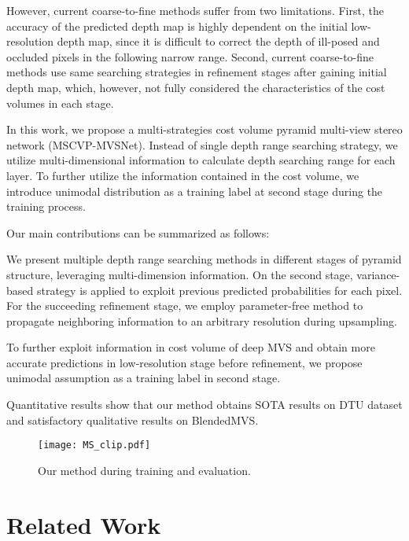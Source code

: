 \documentclass{article}
\begin{document}
However, current coarse-to-fine methods suffer from two limitations.
First, the accuracy of the predicted depth map is highly dependent on the initial low-resolution depth map, since it is difficult to correct the depth of ill-posed and occluded pixels in the following narrow range. 
Second, current coarse-to-fine methods use same searching strategies in refinement stages after gaining initial depth map, which, however, not fully considered the characteristics of the cost volumes in each stage.

In this work, we propose a multi-strategies cost volume pyramid multi-view stereo network (MSCVP-MVSNet).
Instead of single depth range searching strategy, we utilize multi-dimensional information to calculate depth searching range for each layer.
To further utilize the information contained in the cost volume, we introduce unimodal distribution as a training label at second stage during the training process.

Our main contributions can be summarized as follows:

We present multiple depth range searching methods in different stages of pyramid structure, leveraging multi-dimension information.
On the second stage, variance-based strategy is applied to exploit previous predicted probabilities for each pixel.
For the succeeding refinement stage, we employ parameter-free method to propagate neighboring information to an arbitrary resolution during upsampling.

To further exploit information in cost volume of deep MVS and obtain more accurate predictions in low-resolution stage before refinement, we propose unimodal assumption as a training label in second stage.

Quantitative results show that our method obtains SOTA results on DTU dataset and satisfactory qualitative results on BlendedMVS.\\
\begin{figure}
	\begin{center}
		\texttt{[image: MS\_clip.pdf]}
	\end{center}
	\caption{Our method during training and evaluation.}
	\label{figure:MS}
\end{figure}
\section{Related Work}
\label{sec:2}
\end{document}
